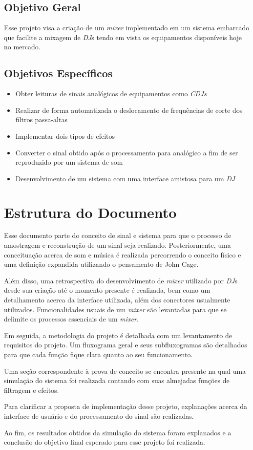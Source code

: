 \subsection{Objetivo Geral}
Esse projeto visa a criação de um \textit{mixer} implementado em um sistema embarcado que facilite a mixagem de \textit{DJ}s tendo em vista os equipamentos disponíveis hoje no mercado.

\subsection{Objetivos Específicos}
\begin{itemize}
    \item Obter leituras de sinais analógicos de equipamentos como \textit{CDJs}
    \item Realizar de forma automatizada o deslocamento de frequências de corte dos filtros passa-altas
    \item Implementar dois tipos de efeitos
    \item Converter o sinal obtido após o processamento para analógico a fim de ser reproduzido por um sistema de som
    \item Desenvolvimento de um sistema com uma interface amistosa para um \textit{DJ}
\end{itemize}

\section{Estrutura do Documento}

Esse documento parte do conceito de sinal e sistema para que o processo de amostragem e reconstrução de um sinal seja realizado. Posteriormente, uma conceituação acerca de som e música é realizada percorrendo o conceito físico e uma definição expandida utilizando o pensamento de John Cage. 

Além disso, uma retrospectiva do desenvolvimento de \textit{mixer} utilizado por \textit{DJ}s desde sua criação até o momento presente é realizada, bem como um detalhamento acerca da interface utilizada, além dos conectores usualmente utilizados. Funcionalidades usuais de um \textit{mixer} são levantadas para que se delimite os processos essenciais de um \textit{mixer}.

Em seguida, a metodologia do projeto é detalhada com um levantamento de requisitos do projeto. Um fluxograma geral e seus subfluxogramas são detalhados para que cada função fique clara quanto ao seu funcionamento. 

Uma seção correspondente à prova de conceito se encontra presente na qual uma simulação do sistema foi realizada contando com suas almejadas funções de filtragem e efeitos. 

Para clarificar a proposta de implementação desse projeto, explanações acerca da interface de usuário e do processamento do sinal são realizadas.

Ao fim, os resultados obtidos da simulação do sistema foram explanados e a conclusão do objetivo final esperado para esse projeto foi realizada.
